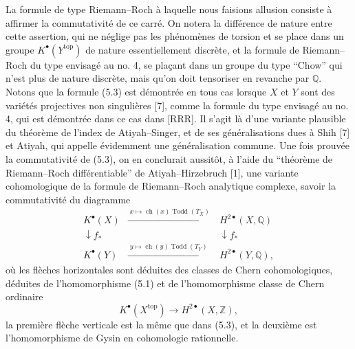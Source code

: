\documentclass[11pt]{article}
\newcommand{\ch}{\operatorname{ch}}
\newcommand{\Todd}{\operatorname{Todd}}
\begin{document}
La formule de type Riemann--Roch \`a laquelle nous faisions allusion consiste \`a affirmer la commutativit\'e de ce carr\'e. On notera la diff\'erence de nature entre cette assertion, qui ne n\'eglige pas les ph\'enom\`enes de torsion et se place dans un groupe $K^\bullet(Y^{\mathrm{top}})$ de nature essentiellement discr\`ete, et la formule de Riemann--Roch du type envisag\'e au no. 4, se pla\c{c}ant dans un groupe du type ``Chow'' qui n'est plus de nature discr\`ete, mais qu'on doit tensoriser en revanche par $\mathbb Q$. Notons que la formule (5.3) est d\'emontr\'ee en tous cas lorsque $X$ et $Y$ sont des vari\'et\'es projectives non singuli\`eres [7], comme la formule du type envisag\'e au no. 4, qui est d\'emontr\'ee dans ce cas dans [RRR]. Il s'agit l\`a d'une variante plausible du th\'eor\`eme de l'index de Atiyah--Singer, et de ses g\'en\'eralisations dues \`a Shih [7] et Atiyah, qui appelle \'evidemment une g\'en\'eralisation commune. Une fois prouv\'ee la commutativit\'e de (5.3), on en conclurait aussit\^ot, \`a l'aide du ``th\'eor\`eme de Riemann--Roch diff\'erentiable'' de Atiyah--Hirzebruch [1], une variante cohomologique de la formule de Riemann--Roch analytique complexe, savoir la commutativit\'e du diagramme
\begin{equation}\tag{5.4}
\begin{array}{ccc}
K^\bullet(X) & \xrightarrow{\;x\mapsto \ch(x)\Todd(T_X)\;} & H^{2\bullet}(X,\mathbb Q) \\
\downarrow f_* && \downarrow f_* \\
K^\bullet(Y) & \xrightarrow{\;y\mapsto \ch(y)\Todd(T_Y)\;} & H^{2\bullet}(Y,\mathbb Q),
\end{array}
\end{equation}
o\`u les fl\`eches horizontales sont d\'eduites des classes de Chern cohomologiques, d\'eduites de l'homomorphisme (5.1) et de l'homomorphisme classe de Chern ordinaire
\[
K^\bullet(X^{\mathrm{top}})\longrightarrow H^{2\bullet}(X,\mathbb Z),
\]
la premi\`ere fl\`eche verticale est la m\^eme que dans (5.3), et la deuxi\`eme est l'homomorphisme de Gysin en cohomologie rationnelle.
\end{document}
